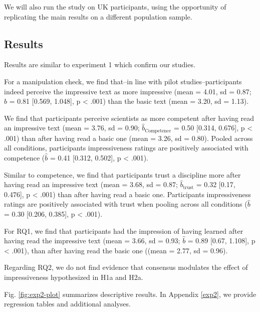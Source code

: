 \documentclass[
  doc,floatsintext]{apa6}
\begin{document}
We will also run the study on UK participants, using the opportunity of replicating the main results on a different population sample.

\hypertarget{results-1}{%
\subsection{Results}\label{results-1}}

Results are similar to experiment 1 which confirm our studies.

For a manipulation check, we find that--in line with pilot studies--participants indeed perceive the impressive text as more impressive (mean = 4.01, sd = 0.87; \(\hat{b}\) = 0.81 {[}0.569, 1.048{]}, p \textless{} .001) than the basic text (mean = 3.20, sd = 1.13).

We find that participants perceive scientists as more competent after having read an impressive text (mean = 3.76, sd = 0.90; \(\hat{b}_{\text{Competence}}\) = 0.50 {[}0.314, 0.676{]}, p \textless{} .001) than after having read a basic one (mean = 3.26, sd = 0.80). Pooled across all conditions, participants impressiveness ratings are positively associated with competence (\(\hat{b}\) = 0.41 {[}0.312, 0.502{]}, p \textless{} .001).

Similar to competence, we find that participants trust a discipline more after having read an impressive text (mean = 3.68, sd = 0.87; \(\hat{b}_{\text{trust}}\) = 0.32 {[}0.17, 0.476{]}, p \textless{} .001) than after having read a basic one. Participants impressiveness ratings are positively associated with trust when pooling across all conditions (\(\hat{b}\) = 0.30 {[}0.206, 0.385{]}, p \textless{} .001).

For RQ1, we find that participants had the impression of having learned after having read the impressive text (mean = 3.66, sd = 0.93; \(\hat{b}\) = 0.89 {[}0.67, 1.108{]}, p \textless{} .001), than after having read the basic one ((mean = 2.77, sd = 0.96).

Regarding RQ2, we do not find evidence that consensus modulates the effect of impressiveness hypothesized in H1a and H2a.

Fig. \ref{fig:exp2-plot} summarizes descriptive results. In Appendix \ref{exp2}, we provide regression tables and additional analyses.
\end{document}
